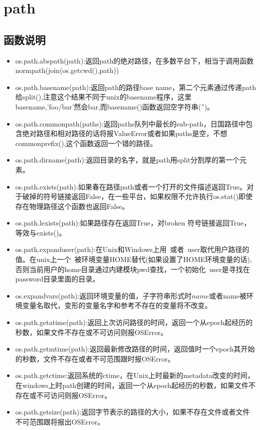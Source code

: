 \section{path}
\subsection{函数说明}
\begin{itemize}
\item os.path.abspath(path):返回path的绝对路径，在多数平台下，相当于调用函数normpath(join(os.getcwd(),path))
\item os.path.basename(path):返回path的路径base name，第二个元素通过传递path给split(),注意这个结果不同于unix的basename程序，这里basename,'foo/bar'然会bar,而basename()函数返回空字符串('')。
\item os.path.commonpath(paths):返回paths队列中最长的sub-path，日国路径中包含绝对路径和相对路径的话将报ValueError或者如果paths是空，不想commonprefix(),这个函数返回一个错的路径。
\item os.path.dirname(path):返回目录的名字，就是path用split分割厚的第一个元素。
\item os.path.exists(path):如果春在路径path或者一个打开的文件描述返回True。对于破掉的符号链接返回False，在一些平台，如果权限不允许执行os.stat()即使存在物理路径这个函数也返回False。
\item os.path.lexists(path):如果路径存在返回True，对broken 符号链接返回True，等效与exists()。
\item os.path.expanduser(path):在Unix和Windows上用~或者~user取代用户路径的值。在unix上一个~被环境变量HOME替代(如果设置了HOME环境变量的话),否则当前用户的home目录通过内建模块pwd查找，一个初始化~user是寻找在password目录里面的目录。\item os.expandvars(path):返回环境变量的值，子字符串形式时${name}或者$name被环境变量名取代，变形的变量名字和参考不存在的变量将不改变。
\item os.path.getatime(path):返回上次访问路径的时间，返回一个从epoch起经历的秒数，如果文件不存在或不可访问则报OSError。
\item os.path.getmtime(path):返回最新修改路径的时间，返回值时一个epoch其开始的秒数，文件不存在或者不可范围跟时报OSError。
\item os.path.getctime:返回系统的ctime，在Unix上时最新的metadata改变的时间，在windows上时path创建的时间，返回一个从epoch起经历的秒数，如果文件不存在或不可访问则报OSError。
\item os.path.getsize(path):返回字节表示的路径的大小，如果不存在文件或者文件不可范围跟将报出OSError。

\end{itemize}
